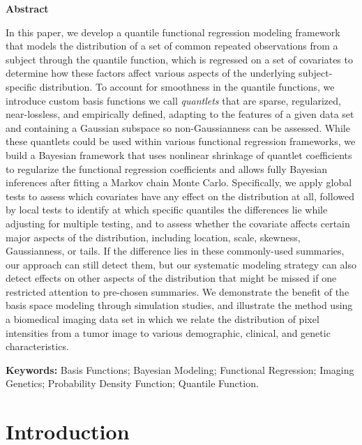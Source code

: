 \documentclass[11pt]{article}
\begin{document}
\begin{center}
\textbf{Abstract}
\end{center}
In this paper, we develop a quantile functional regression modeling framework that models the
distribution of a set of 
common repeated observations
from a subject through the quantile function, which is regressed on a set of covariates
to determine how these factors affect various aspects of the underlying subject-specific distribution.
To account for smoothness in the quantile functions, we introduce custom basis functions we call \textit{quantlets} that are sparse, regularized, near-lossless, %
and empirically defined, adapting to the features of a given data set and containing a Gaussian subspace so {non-Gaussianness} can be assessed.   
While these quantlets could be used within various functional regression frameworks, we build a Bayesian framework
that uses nonlinear shrinkage of quantlet coefficients to regularize the functional regression coefficients and allows fully Bayesian inferences after fitting a Markov chain Monte Carlo.  Specifically, we apply global tests to assess which covariates have any effect on the distribution at all, followed by local tests to identify at which specific quantiles the differences lie while adjusting for multiple testing, and to assess whether the covariate affects certain major aspects of the distribution, including location, scale, skewness, Gaussianness, or tails.  If the difference lies in these commonly-used summaries, our approach can still detect them, but our systematic modeling strategy can also detect effects on other aspects of the distribution that might be missed if one restricted attention to pre-chosen summaries.   We demonstrate the benefit of the basis space modeling through simulation studies, and illustrate the method using a biomedical imaging data set in which we relate the distribution of pixel intensities from a tumor image to various demographic, clinical, and genetic characteristics.

\vspace*{.3in}
\normalsize{\textbf{Keywords:} \textnormal{Basis Functions;   
          Bayesian Modeling;  
					Functional Regression; 
					Imaging Genetics; 
			        Probability Density Function;
			        Quantile Function.}}


\newpage

\section{ {\bf Introduction} }
\end{document}
